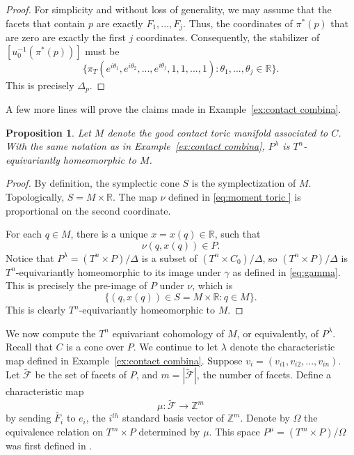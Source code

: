 \documentclass[12pt]{amsart}
\newtheorem{proposition}[theorem]{Proposition}
\theoremstyle{definition}
\numberwithin{equation}{section}
\begin{document}
\begin{proof}
For simplicity and without loss of generality, we may assume that
the facets that contain $p$ are exactly $F_{1},...,F_{j}$. Thus, the
coordinates of $\pi^{*}(p)$ that are zero are exactly the first $j$
coordinates. Consequently, the stabilizer of
$[u_{0}^{-1}(\pi^{*}(p))]$ must be
$$
\{
\pi_{T}(e^{i\theta_{1}},e^{i\theta_{2}},...,e^{i\theta_{j}},1,1,...,1):
\theta_{1},...,\theta_{j}\in {{\mathbb{R}}}\}.$$ This is precisely $\Delta_{p}$.
\end{proof}

A few more lines will prove the claims made in
Example~\ref{ex:contact combina}.

\begin{proposition}\label{prop:contact combina}
Let $M$ denote the good contact toric manifold associated to $C$.
With the same notation as in Example~\ref{ex:contact combina},
$P^{\lambda}$ is $T^n$-equivariantly homeomorphic to $M$.
\end{proposition}
\begin{proof}
By definition, the symplectic cone $S$ is the symplectization of
$M$. Topologically, $S= M\times {{\mathbb{R}}}$. The map $\nu$ defined in
\eqref{eq:moment toric } is proportional on the second coordinate.

For each $q\in M$, there is a unique $x=x(q)\in {{\mathbb{R}}}$, such that
$$\nu(q,x(q))\in P .$$
Notice that $P^{\lambda}=(T^n\times P)/\Delta$ is a subset of
$(T^n\times C_{0})/\Delta$, so $(T^n\times P)/\Delta$ is
$T^n$-equivariantly homeomorphic to its image under $\gamma$ as
defined in \eqref{eq:gamma}. This is precisely the pre-image of $P$
under $\nu$, which is
$$\{(q,x(q))\in S=M\times {{\mathbb{R}}} : q\in M\}.$$ This is clearly $T^n$-equivariantly
homeomorphic to $M$.
\end{proof}

We now compute the $T^n$ equivariant cohomology of $M$, or
equivalently, of $P^{\lambda}$. Recall that $C$ is a cone over $P$.
We continue to let $\lambda$ denote the characteristic map defined
in Example~\ref{ex:contact combina}. Suppose
$v_{i}=(v_{i1},v_{i2},...,v_{in})$. Let $\tilde{{\mathcal{F}}}$ be the set of
facets of $P$, and $m=|\tilde{{\mathcal{F}}}|$, the number of facets. Define a
characteristic map
\begin{equation}\label{eq:mu}
 \mu
:\tilde{{\mathcal{F}}}\rightarrow {{\mathbb{Z}}}^m
\end{equation}
by sending $\tilde{F_{i}}$ to $e_{i}$, the $i^{th}$ standard basis
vector of ${{\mathbb{Z}}}^m$. Denote by $\Omega$ the equivalence relation on
$T^m\times P$ determined by $\mu$. This space $P^{\mu}=(T^m\times
P)/\Omega$ was first defined in \cite{DJ}.
\end{document}
